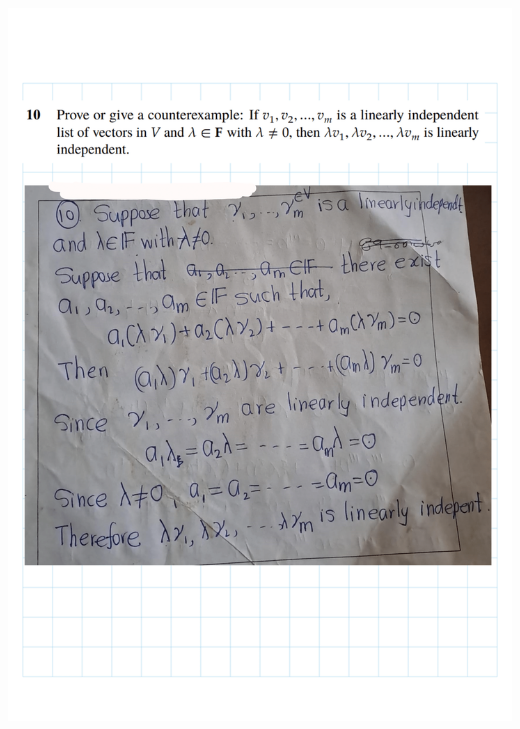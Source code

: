 \documentclass[
]{book}
\theoremstyle{definition}
\theoremstyle{definition}
\theoremstyle{definition}
\theoremstyle{definition}
\theoremstyle{remark}
\begin{document}
\includegraphics{fig/Ex2A/Ex2A-12.png}
\end{document}

